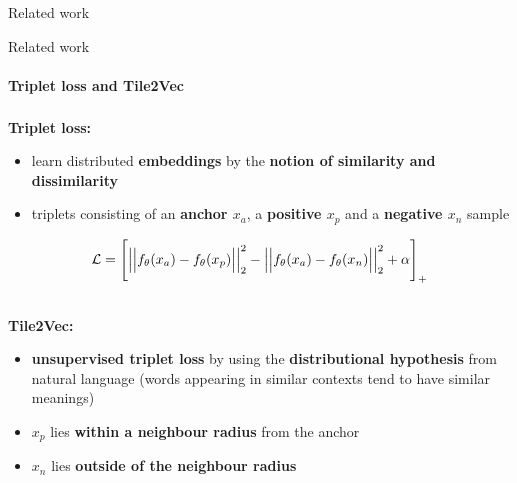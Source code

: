 \documentclass[aspectratio=169, professionalfonts]{beamer}
\begin{document}
\begin{frame}{Related work}
	
\end{frame}

\begin{frame}{Related work}
    \framesubtitle{Triplet loss and Tile2Vec}
    \textbf{Triplet loss:}\textsuperscript{\cite{FaceNet}}
	\begin{itemize}
		\item learn distributed \textbf{embeddings} by the \textbf{notion of similarity and dissimilarity} 
		\item triplets consisting of an \textbf{anchor $x_a$}, a \textbf{positive $x_p$} and a \textbf{negative $x_n$} sample
	\end{itemize}
	\begin{equation}
        \centering
        \mathcal{L} = \Bigg [\Big|\Big|f_\theta(x_a) - f_\theta(x_p)\Big|\Big|_2^2 - \Big|\Big|f_\theta(x_a) - f_\theta(x_n)\Big|\Big|_2^2 + \alpha \Bigg]_+
        \label{eq:Triplet-Loss}
    \end{equation}
	\\[10pt]
	\textbf{Tile2Vec:}\textsuperscript{\cite{Tile2Vec}}
	\begin{itemize}
	    \item \textbf{unsupervised triplet loss} by using the \textbf{distributional hypothesis} from natural language (words appearing in similar contexts tend to have similar meanings)
	    \item $x_p$ lies \textbf{within a neighbour radius} from the anchor
	    \item $x_n$ lies \textbf{outside of the neighbour radius}
	\end{itemize}
	
\end{frame}
\end{document}
